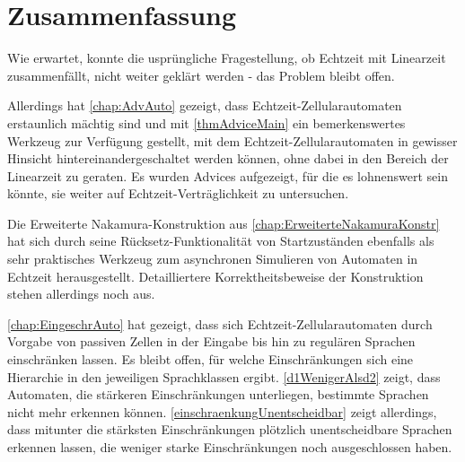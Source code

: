 \chapter{Zusammenfassung}

Wie erwartet, konnte die usprüngliche Fragestellung, ob Echtzeit mit Linearzeit zusammenfällt,
nicht weiter geklärt werden - das Problem bleibt offen.

Allerdings hat \cref{chap:AdvAuto} gezeigt, dass Echtzeit-Zellularautomaten erstaunlich mächtig sind
und mit \cref{thmAdviceMain} ein bemerkenswertes Werkzeug zur Verfügung gestellt,
mit dem Echtzeit-Zellularautomaten in gewisser Hinsicht hintereinandergeschaltet werden können,
ohne dabei in den Bereich der Linearzeit zu geraten.
Es wurden Advices aufgezeigt, für die es lohnenswert sein könnte, sie weiter auf Echtzeit-Verträglichkeit zu untersuchen.

Die Erweiterte Nakamura-Konstruktion aus \cref{chap:ErweiterteNakamuraKonstr} hat sich durch seine Rücksetz-Funktionalität
von Startzuständen ebenfalls als sehr praktisches Werkzeug zum asynchronen Simulieren von Automaten in Echtzeit herausgestellt.
Detailliertere Korrektheitsbeweise der Konstruktion stehen allerdings noch aus.

\cref{chap:EingeschrAuto} hat gezeigt, dass sich Echtzeit-Zellularautomaten
durch Vorgabe von passiven Zellen in der Eingabe bis hin zu regulären Sprachen einschränken lassen.
Es bleibt offen, für welche Einschränkungen sich eine Hierarchie in den jeweiligen Sprachklassen ergibt.
\cref{d1WenigerAlsd2} zeigt, dass Automaten, die stärkeren Einschränkungen unterliegen, bestimmte Sprachen
nicht mehr erkennen können.
\cref{einschraenkungUnentscheidbar} zeigt allerdings, dass mitunter die stärksten Einschränkungen
plötzlich unentscheidbare Sprachen erkennen lassen, die weniger starke Einschränkungen noch ausgeschlossen haben.
